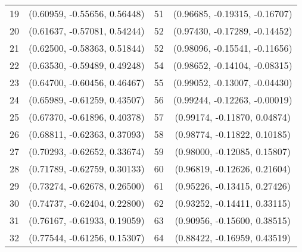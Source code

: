 \documentclass[11pt]{article}
\begin{document}
\begin{table}[ht]
{\begin{tabular}{c c c c }
             19 & (0.60959, -0.55656, 0.56448) & 51 & (0.96685, -0.19315, -0.16707) \\
             20 & (0.61637, -0.57081, 0.54244) & 52 & (0.97430, -0.17289, -0.14452) \\
             21 & (0.62500, -0.58363, 0.51844) & 52 & (0.98096, -0.15541, -0.11656) \\
             22 & (0.63530, -0.59489, 0.49248) & 54 & (0.98652, -0.14104, -0.08315) \\
             23 & (0.64700, -0.60456, 0.46467) & 55 & (0.99052, -0.13007, -0.04430) \\
             24 & (0.65989, -0.61259, 0.43507) & 56 & (0.99244, -0.12263, -0.00019) \\
             25 & (0.67370, -0.61896, 0.40378) & 57 & (0.99174, -0.11870, 0.04874) \\
             26 & (0.68811, -0.62363, 0.37093) & 58 & (0.98774, -0.11822, 0.10185) \\
             27 & (0.70293, -0.62652, 0.33674) & 59 & (0.98000, -0.12085, 0.15807) \\
             28 & (0.71789, -0.62759, 0.30133) & 60 & (0.96819, -0.12626, 0.21604) \\
             29 & (0.73274, -0.62678, 0.26500) & 61 & (0.95226, -0.13415, 0.27426) \\
             30 & (0.74737, -0.62404, 0.22800) & 62 & (0.93252, -0.14411, 0.33115) \\
             31 & (0.76167, -0.61933, 0.19059) & 63 & (0.90956, -0.15600, 0.38515) \\
             32 & (0.77544, -0.61256, 0.15307) & 64 & (0.88422, -0.16959, 0.43519) \\
\bottomrule
\end{tabular} }
\label{table64p}
\end{table}
\end{document}
